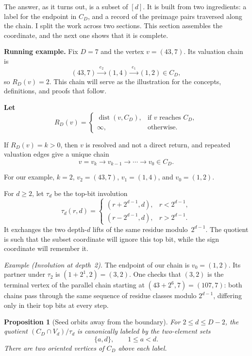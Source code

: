 \documentclass[11pt]{amsart}
\newtheorem{proposition}[theorem]{Proposition}
\theoremstyle{definition}
\theoremstyle{remark}
\begin{document}
The answer, as it turns out, is a subset of $[d]$.  It is built from two ingredients: a
label for the endpoint in $C_D$, and a record of the preimage pairs
traversed along the chain.  I split the work across two sections.  This
section assembles the coordinate, and the next one shows that it is
complete.

\begin{examplebox}
\textbf{Running example.}
Fix $D=7$ and the vertex $v=(43,7)$.  Its valuation chain is
\[
  (43,7)\xrightarrow{\;e_2\;}(1,4)\xrightarrow{\;e_1\;}(1,2)\in C_D,
\]
so $R_D(v)=2$.  This chain will serve as the illustration for the concepts, definitions, and proofs 
that follow.
\end{examplebox}

\textbf{Let}
\[
R_D(v)=
\begin{cases}
\operatorname{dist}(v,C_D), & \text{if } v \text{ reaches } C_D,\\
\infty, & \text{otherwise.}
\end{cases}
\]

\begin{keybox}
If $R_D(v)=k>0$, then $v$ is resolved and not a direct return, and
repeated valuation edges give a unique chain
\[
v=v_k\to v_{k-1}\to\cdots\to v_0\in C_D.
\]
\end{keybox}

For our example, $k=2$, $v_2=(43,7)$, $v_1=(1,4)$, and $v_0=(1,2)$.

For $d\ge2$, let $\tau_d$ be the top-bit involution
\[
\tau_d(r,d)=
\begin{cases}
(r+2^{d-1},d),&r<2^{d-1},\\
(r-2^{d-1},d),&r>2^{d-1}.
\end{cases}
\]
It exchanges the two depth-$d$ lifts of the same residue modulo~$2^{d-1}$.
The quotient is such that the subset coordinate will ignore this
top bit, while the sign coordinate will remember it.

\begin{examplebox}
\textit{Example (Involution at depth~2).}
The endpoint of our chain is $v_0=(1,2)$.  Its partner under $\tau_2$ is
$(1+2^1,2)=(3,2)$.  One checks that $(3,2)$ is the terminal vertex of the
parallel chain starting at $(43+2^6,7)=(107,7)$: both chains pass through
the same sequence of residue classes modulo $2^{d-1}$, differing only in
their top bits at every step.
\end{examplebox}

\begin{proposition}[Seed orbits away from the boundary]\label{prop:seeds}
For $2\le d\le D-2$, the quotient $(C_D\cap V_d)/\tau_d$ is
canonically labeled by the two-element sets
\[
\{a,d\},\qquad 1\le a<d.
\]
There are two oriented vertices of $C_D$ above each label.
\end{proposition}
\end{document}
